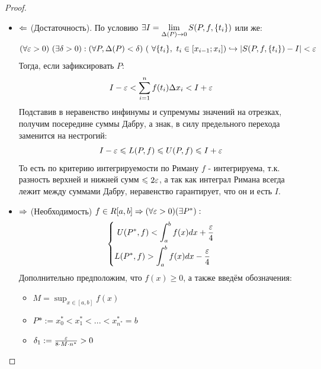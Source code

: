 \begin{proof}~
	\begin{itemize}
		\item $\Leftarrow$ (Достаточность). По условию  $\exists I = \lim\limits_{ \Delta(P) \to 0} S(P, f, \{t_i\})$ или же:
		\[
			(\forall \varepsilon > 0)\ (\exists \delta > 0) : (\forall P, \Delta(P) < \delta)\ (\ \forall \{t_i\},\ t_i \in [x_{i - 1}; x_i])\hookrightarrow |S(P, f, \{t_i\}) - I| < {\varepsilon}
		\]
		Тогда, если зафиксировать $P$:
		\[
			I-\varepsilon < \sum\limits_{i=  1}^nf(t_i)\Delta x_i < I+\varepsilon
		\]
		Подставив в неравенство инфинумы и супремумы значений на отрезках, получим посередине суммы Дабру, а знак, в силу предельного перехода заменится на нестрогий:
		\[
			I-\varepsilon \leqslant L(P, f) \leqslant U(P, f) \leqslant I+\varepsilon
		\]
		То есть по критерию интегрируемости по Риману $f$ - интегрируема, т.к. разность верхней и нижней сумм $\leqslant 2\varepsilon$, а так как интеграл Римана всегда лежит между суммами Дабру, неравенство гарантирует, что он и есть $I$.
		\item $\Rightarrow$ (Необходимость) $f \in R[a,b] \Rightarrow(\forall \varepsilon > 0)(\exists P^*):$
		\[
		\left\{\begin{aligned}
			&\ U(P^*, f) < \int_a^bf(x)dx + \frac{\varepsilon}{4}
			\\
			&L(P^*, f) > \int_a^bf(x)dx - \frac{\varepsilon}{4}
		\end{aligned}\right.
		\]
		Дополнительно предположим, что $f(x) \geq0$, а также введём обозначения:
		\begin{itemize}
			\item$
			M=\sup_{x\in [a,b]} f(x)$
			\item ${P*:=x_0^*<x_1^*<...<x_{n^*}^*=b}$ 
			\item $\delta_1 := \frac{\varepsilon}{8\cdot M\cdot n^*} > 0$
		\end{itemize}
	

\end{itemize}
\end{proof}
